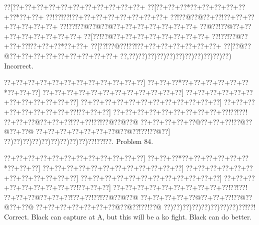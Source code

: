 \documentclass[a5paper]{article}
\begin{document}
\begin{center}
{\goo
\0??[\0??+\0??+\0??+\0??+\0??+\0??+\0??+\0??+\0??+\0??+\0??+
\0??[\0??+\0??+\0??*\0??+\0??+\0??+\0??+\0??+\0??*\0??+\0??+
\0??!\0??!\0??!\0??+\0??+\0??+\0??+\0??+\0??+\0??+\0??+
\0??!\0??@\0??@\0??+\0??!\0??+\0??+\0??+\0??+\0??+\0??+\0??+
\0??!\0??!\0??@\0??@\0??@\0??+\0??+\0??+\0??+\0??+\0??+\0??+
\0??@\0??!\0??@\0??+\0??+\0??+\0??+\0??+\0??+\0??+\0??+
\0??[\0??!\0??@\0??+\0??+\0??+\0??+\0??+\0??+\0??+\0??+
\0??!\0??!\0??@\0??+\0??+\0??!\0??+\0??+\0??*\0??+\0??+
\0??[\0??!\0??@\0??!\0??!\0??+\0??+\0??+\0??+\0??+\0??+\0??+
\0??[\0??@\0??@\0??+\0??+\0??+\0??+\0??+\0??+\0??+\0??+\0??+
\0??,\0??)\0??)\0??)\0??)\0??)\0??)\0??)\0??)\0??)\0??)\0??)
}
Incorrect. 

\end{center}
\newpage
\begin{center}
{\goo
\0??+\0??+\0??+\0??+\0??+\0??+\0??+\0??+\0??+\0??+\0??+\0??]
\0??+\0??+\0??*\0??+\0??+\0??+\0??+\0??+\0??*\0??+\0??+\0??]
\0??+\0??+\0??+\0??+\0??+\0??+\0??+\0??+\0??+\0??+\0??+\0??]
\0??+\0??+\0??+\0??+\0??+\0??+\0??+\0??+\0??+\0??+\0??+\0??]
\0??+\0??+\0??+\0??+\0??+\0??+\0??+\0??+\0??+\0??+\0??+\0??]
\0??+\0??+\0??+\0??+\0??+\0??+\0??+\0??+\0??!\0??+\0??+\0??]
\0??+\0??+\0??+\0??+\0??+\0??+\0??+\0??+\0??+\0??!\0??!\0??!
\0??+\0??+\0??@\0??+\0??+\0??!\0??+\0??!\0??!\0??@\0??@\0??@
\0??+\0??+\0??+\0??+\0??@\0??+\0??+\0??!\0??@\0??@\0??+\0??@
\0??+\0??+\0??+\0??+\0??+\0??+\0??@\0??@\0??!\0??!\0??@\0??]
\0??)\0??)\0??)\0??)\0??)\0??)\0??)\0??)\0??)\0??!\0??!\0??.
}
Problem 84.

\end{center}
\begin{center}
{\goo
\0??+\0??+\0??+\0??+\0??+\0??+\0??+\0??+\0??+\0??+\0??+\0??]
\0??+\0??+\0??*\0??+\0??+\0??+\0??+\0??+\0??*\0??+\0??+\0??]
\0??+\0??+\0??+\0??+\0??+\0??+\0??+\0??+\0??+\0??+\0??+\0??]
\0??+\0??+\0??+\0??+\0??+\0??+\0??+\0??+\0??+\0??+\0??+\0??]
\0??+\0??+\0??+\0??+\0??+\0??+\0??+\0??+\0??+\0??+\0??+\0??]
\0??+\0??+\0??+\0??+\0??+\0??+\0??+\0??+\0??!\0??+\0??+\0??]
\0??+\0??+\0??+\0??+\0??+\0??+\0??+\0??+\0??+\0??!\0??!\0??!
\0??+\0??+\0??@\0??+\0??+\0??!\0??+\0??!\0??!\0??@\0??@\0??@
\0??+\0??+\0??+\0??+\0??@\0??+\0??+\0??!\0??@\0??@\0??+\0??@
\0??+\0??+\0??+\0??+\0??+\0??+\0??@\0??@\0??!\0??!\0??@
\0??)\0??)\0??)\0??)\0??)\0??)\0??)\0??)\0??!\0??!
}
Correct. Black can capture at A, but this will be a ko fight. Black can do better.

\end{center}
\end{document}
